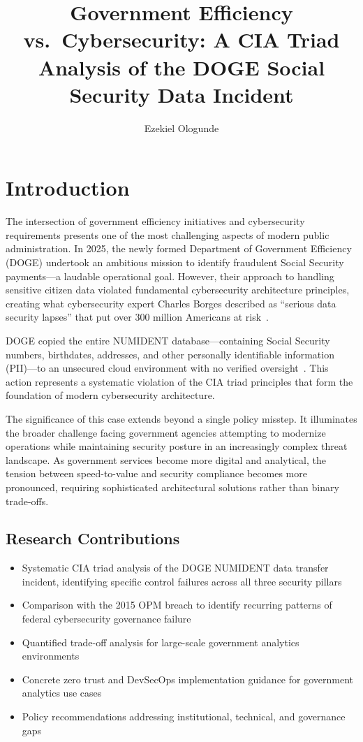 \documentclass[sigconf,nonacm]{acmart}
\title{Government Efficiency vs.\ Cybersecurity: A CIA Triad Analysis of the DOGE Social Security Data Incident}
\author{Ezekiel Ologunde}
\affiliation{\institution{Independent Researcher}\city{Boston}\state{MA}\country{USA}}
\begin{document}
\hfuzz=5pt
\maketitle

\section{Introduction}

The intersection of government efficiency initiatives and cybersecurity requirements
presents one of the most challenging aspects of modern public administration. In 2025,
the newly formed Department of Government Efficiency (DOGE) undertook an ambitious
mission to identify fraudulent Social Security payments---a laudable operational goal.
However, their approach to handling sensitive citizen data violated fundamental
cybersecurity architecture principles, creating what cybersecurity expert Charles Borges
described as ``serious data security lapses'' that put over 300 million Americans at
risk~\cite{nazzaro2025}.

DOGE copied the entire NUMIDENT database---containing Social Security numbers,
birthdates, addresses, and other personally identifiable information (PII)---to an
unsecured cloud environment with no verified oversight~\cite{nazzaro2025}. This action
represents a systematic violation of the CIA triad principles that form the foundation
of modern cybersecurity architecture.

The significance of this case extends beyond a single policy misstep. It illuminates
the broader challenge facing government agencies attempting to modernize operations
while maintaining security posture in an increasingly complex threat landscape. As
government services become more digital and analytical, the tension between
speed-to-value and security compliance becomes more pronounced, requiring sophisticated
architectural solutions rather than binary trade-offs.

\subsection{Research Contributions}

\begin{itemize}
  \item Systematic CIA triad analysis of the DOGE NUMIDENT data transfer incident,
        identifying specific control failures across all three security pillars
  \item Comparison with the 2015 OPM breach to identify recurring patterns of federal
        cybersecurity governance failure
  \item Quantified trade-off analysis for large-scale government analytics environments
  \item Concrete zero trust and DevSecOps implementation guidance for government
        analytics use cases
  \item Policy recommendations addressing institutional, technical, and governance gaps
\end{itemize}
\end{document}

